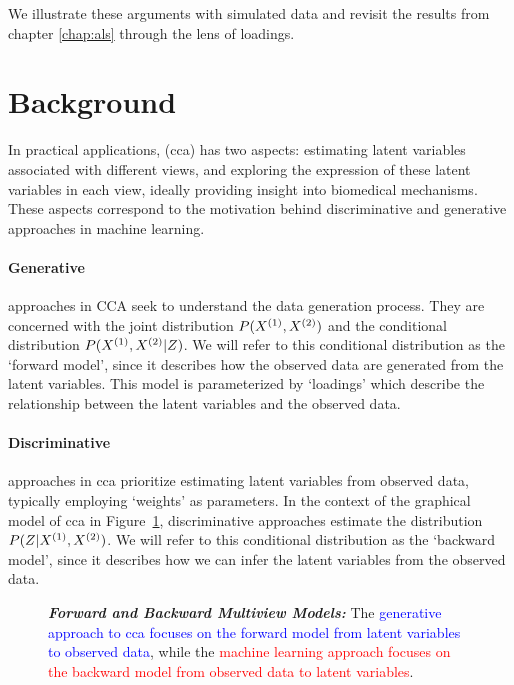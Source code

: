 We illustrate these arguments with simulated data and revisit the results from chapter \ref{chap:als} through the lens of loadings.

\section{Background}

In practical applications, (\acrshort{cca}) has two aspects: estimating latent variables associated with different views, and exploring the expression of these latent variables in each view, ideally providing insight into biomedical mechanisms.
These aspects correspond to the motivation behind discriminative and generative approaches in machine learning.

\paragraph{Generative} approaches in CCA seek to understand the data generation process.
They are concerned with the joint distribution $P(X^{(1)},X^{(2)})$ and the conditional distribution $P(X^{(1)},X^{(2)}|Z)$.
We will refer to this conditional distribution as the `forward model', since it describes how the observed data are generated from the latent variables.
This model is parameterized by `loadings' which describe the relationship between the latent variables and the observed data.
\paragraph{Discriminative} approaches in \acrshort{cca} prioritize estimating latent variables from observed data, typically employing `weights' as parameters.
In the context of the graphical model of \acrshort{cca} in Figure~\ref{fig:forward-backward-models}, discriminative approaches estimate the distribution $P(Z|X^{(1)},X^{(2)})$.
We will refer to this conditional distribution as the `backward model', since it describes how we can infer the latent variables from the observed data.

\begin{figure}
    \centering
    \caption[Forward and Backward Multiview Models]{\textit{\textbf{Forward and Backward Multiview Models:}} The \textcolor{blue}{generative approach to \acrshort{cca} focuses on the forward model from latent variables to observed data}, while the \textcolor{red}{machine learning approach focuses on the backward model from observed data to latent variables}.}\label{fig:forward-backward-models}
\end{figure}

